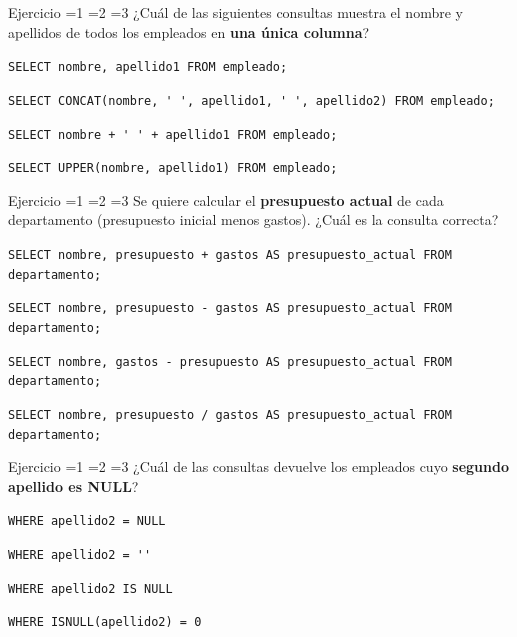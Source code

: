 \documentclass[12pt, a4paper]{article}
\newcommand{\estrella}{{\color{Goldenrod}\faStarSolid}}
\newcommand{\estrellavacia}{{\color{gray!45}\faStarSolid}}
\newcommand{\nivel}[1]{%
  \ifnum#1=1\estrella\estrellavacia\estrellavacia\fi
  \ifnum#1=2\estrella\estrella\estrellavacia\fi
  \ifnum#1=3\estrella\estrella\estrella\fi
}
\newcounter{numej}
\newcommand{\ej}{\stepcounter{numej}\thenumej}
\begin{document}
\begin{ejercicio}{Ejercicio \ej}{\nivel{1}}
¿Cuál de las siguientes consultas muestra el nombre y apellidos de
todos los empleados en \textbf{una única columna}?

\begin{opciones}
  \item \lstinline|SELECT nombre, apellido1 FROM empleado;|
  \item \lstinline|SELECT CONCAT(nombre, ' ', apellido1, ' ', apellido2) FROM empleado;|
  \item \lstinline|SELECT nombre + ' ' + apellido1 FROM empleado;|
  \item \lstinline|SELECT UPPER(nombre, apellido1) FROM empleado;|
\end{opciones}
\end{ejercicio}

\begin{ejercicio}{Ejercicio \ej}{\nivel{1}}
Se quiere calcular el \textbf{presupuesto actual} de cada departamento
(presupuesto inicial menos gastos). ¿Cuál es la consulta correcta?

\begin{opciones}
  \item \lstinline|SELECT nombre, presupuesto + gastos AS presupuesto_actual FROM departamento;|
  \item \lstinline|SELECT nombre, presupuesto - gastos AS presupuesto_actual FROM departamento;|
  \item \lstinline|SELECT nombre, gastos - presupuesto AS presupuesto_actual FROM departamento;|
  \item \lstinline|SELECT nombre, presupuesto / gastos AS presupuesto_actual FROM departamento;|
\end{opciones}
\end{ejercicio}

\begin{ejercicio}{Ejercicio \ej}{\nivel{2}}
¿Cuál de las consultas devuelve los empleados cuyo \textbf{segundo
apellido es NULL}?

\begin{opciones}
  \item \lstinline|WHERE apellido2 = NULL|
  \item \lstinline|WHERE apellido2 = ''|
  \item \lstinline|WHERE apellido2 IS NULL|
  \item \lstinline|WHERE ISNULL(apellido2) = 0|
\end{opciones}
\end{ejercicio}
\end{document}
